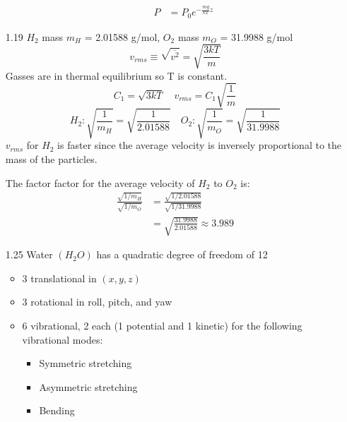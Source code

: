\documentclass{article}
\begin{document}
\begin{enumerate}
\begin{enumerate}
\begin{align*}
                P &= P_0 e^{- \frac{mg}{kT}z}
            \end{align*}
    \end{enumerate}
    \vspace{0.1in}
    \item [1.19]
        \(H_2\) mass \(m_H\) = 2.01588 g/mol, \(O_2\) mass \(m_O\) = 31.9988 g/mol
        \begin{equation*}
            v_{rms} \equiv \sqrt{\overline{v^2}} = \sqrt{\frac{3kT}{m}}
        \end{equation*}
        Gasses are in thermal equilibrium so T is constant.
        \begin{equation*}
            C_1 = \sqrt{3kT} \quad v_{rms} = C_1 \sqrt{\frac{1}{m}}
        \end{equation*} 
        \begin{equation*}
            H_2: \sqrt{\frac{1}{m_H}} = \sqrt{\frac{1}{2.01588}} \quad O_2: \sqrt{\frac{1}{m_O}} = \sqrt{\frac{1}{31.9988}}
        \end{equation*}
        \(v_{rms}\) for \(H_2\) is faster since the average velocity is inversely proportional to the mass of the particles.
         
        The factor factor for the average velocity of \(H_2\) to \(O_2\) is:
        \begin{align*}
            \frac{\sqrt{1/m_H}}{\sqrt{1/m_O}} &= \frac{\sqrt{1/2.01588}}{\sqrt{1/31.9988}} \\
            &= \sqrt{\frac{31.9988}{2.01588}} \approx 3.989
        \end{align*}
    \vspace{0.1in}
    \item [1.25]
        Water \(\left(H_2O\right)\) has a quadratic degree of freedom of 12
        \begin{itemize}
            \item 3 translational in \(\left(x, y, z\right)\)
            \item 3 rotational in roll, pitch, and yaw
            \item 6 vibrational, 2 each (1 potential and 1 kinetic) for the following vibrational modes:
            \begin{itemize}
                \item Symmetric stretching
                \item Asymmetric stretching
                \item Bending
            \end{itemize}
        \end{itemize}

\end{enumerate}
\end{document}
